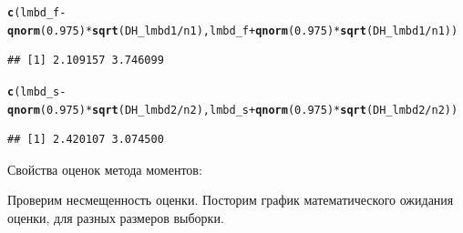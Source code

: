 \documentclass{article}\usepackage[]{graphicx}\usepackage[]{color}
\makeatletter
\newcommand{\hlnum}[1]{\textcolor[rgb]{0.686,0.059,0.569}{#1}}%
\newcommand{\hlopt}[1]{\textcolor[rgb]{0,0,0}{#1}}%
\newcommand{\hlstd}[1]{\textcolor[rgb]{0.345,0.345,0.345}{#1}}%
\newcommand{\hlkwd}[1]{\textcolor[rgb]{0.737,0.353,0.396}{\textbf{#1}}}%
\newenvironment{kframe}{%
 \def\at@end@of@kframe{}%
 \ifinner\ifhmode%
  \def\at@end@of@kframe{\end{minipage}}%
  \begin{minipage}{\columnwidth}%
 \fi\fi%
 \def\FrameCommand##1{\hskip\@totalleftmargin \hskip-\fboxsep
 \colorbox{shadecolor}{##1}\hskip-\fboxsep
     \hskip-\linewidth \hskip-\@totalleftmargin \hskip\columnwidth}%
 \MakeFramed {\advance\hsize-\width
   \@totalleftmargin\z@ \linewidth\hsize
   \@setminipage}}%
 {\par\unskip\endMakeFramed%
 \at@end@of@kframe}
\newenvironment{knitrout}{}{} %
\makeatother
\begin{document}
\begin{knitrout}
\color{fgcolor}\begin{kframe}
\begin{alltt}
\hlkwd{c}\hlstd{(lmbd_f} \hlopt{-} \hlkwd{qnorm}\hlstd{(}\hlnum{0.975}\hlstd{)}\hlopt{*}\hlkwd{sqrt}\hlstd{(DH_lmbd1} \hlopt{/} \hlstd{n1), lmbd_f} \hlopt{+} \hlkwd{qnorm}\hlstd{(}\hlnum{0.975}\hlstd{)}\hlopt{*}\hlkwd{sqrt}\hlstd{(DH_lmbd1} \hlopt{/} \hlstd{n1))}
\end{alltt}
\begin{verbatim}
## [1] 2.109157 3.746099
\end{verbatim}
\begin{alltt}
\hlkwd{c}\hlstd{(lmbd_s} \hlopt{-} \hlkwd{qnorm}\hlstd{(}\hlnum{0.975}\hlstd{)}\hlopt{*}\hlkwd{sqrt}\hlstd{(DH_lmbd2} \hlopt{/} \hlstd{n2), lmbd_s} \hlopt{+} \hlkwd{qnorm}\hlstd{(}\hlnum{0.975}\hlstd{)}\hlopt{*}\hlkwd{sqrt}\hlstd{(DH_lmbd2} \hlopt{/} \hlstd{n2))}
\end{alltt}
\begin{verbatim}
## [1] 2.420107 3.074500
\end{verbatim}
\end{kframe}
\end{knitrout}


Свойства оценок метода моментов:

Проверим несмещенность оценки. Посторим график математического ожидания оценки, для разных размеров выборки.
\end{document}
